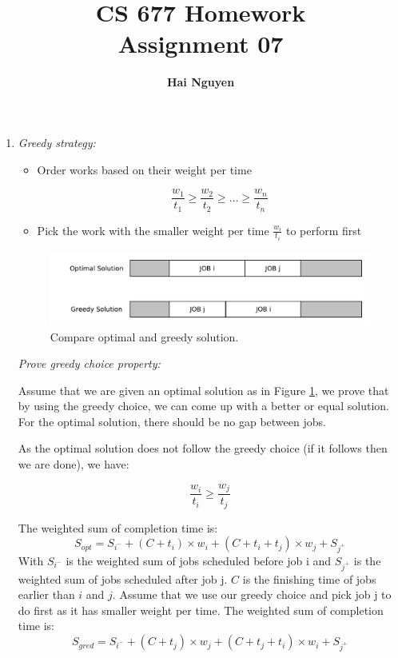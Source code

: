 \documentclass[11pts]{report}
\title{CS 677 Homework \\ Assignment 07}
\author{\textbf{Hai Nguyen}}
\begin{document}
\maketitle

\begin{enumerate}

\item 
\textit{Greedy strategy:}
\begin{itemize}
\item Order works based on their weight per time

\begin{equation*}
\frac{w_1}{t_1} \geq \frac{w_2}{t_2} \geq \hdots \geq \frac{w_n}{t_n}
\end{equation*}

\item Pick the work with the smaller weight per time $\frac{w_i}{t_i}$ to perform first

\end{itemize}


\begin{figure}[htbp]
\begin{center}
\includegraphics[scale=0.5]{Q_1.pdf}
\caption{Compare optimal and greedy solution.}
\label{Fig:1}
\end{center}
\end{figure}

\textit{Prove greedy choice property:}


Assume that we are given an optimal solution as in Figure \ref{Fig:1}, we prove that by using the greedy choice, we can come up with a better or equal solution. For the optimal solution, there should be no gap between jobs.

As the optimal solution does not follow the greedy choice (if it follows then we are done), we have:

\begin{equation}
\frac{w_i}{t_i} \geq \frac{w_j}{t_j}
\label{eq1}
\end{equation}

The weighted sum of completion time is:
\begin{equation*}
S_{opt} = S_{i^-} + (C+ t_i) \times w_i + (C + t_i + t_j) \times w_j + S_{j^+}
\end{equation*}
With $S_{i^-}$ is the weighted sum of jobs scheduled before job i and $S_{j^+}$ is the weighted sum of jobs scheduled after job j. $C$ is the finishing time of jobs earlier than $i$ and $j$.
Assume that we use our greedy choice and pick job j to do first as it has smaller weight per time. The weighted sum of completion time is:
\begin{equation*}
S_{gred} = S_{i^-} + (C + t_j) \times w_j + (C + t_j + t_i) \times w_i + S_{j^+}
\end{equation*}


\end{enumerate}
\end{document}
